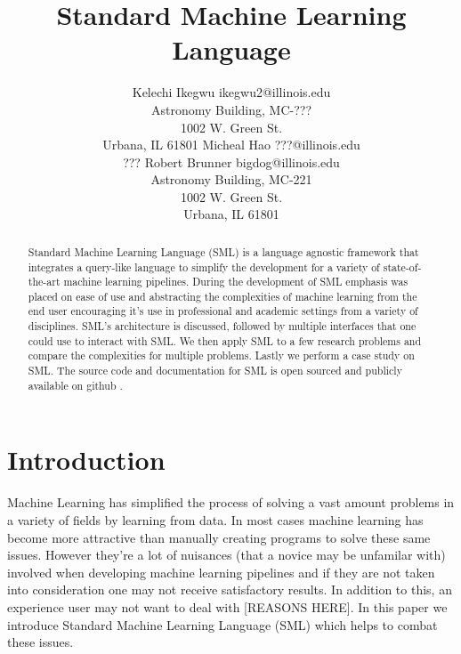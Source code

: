 \documentclass[jair,twoside,11pt,theapa]{article}
\begin{document}
\title{Standard Machine Learning Language}

\author{\name Kelechi Ikegwu \email ikegwu2@illinois.edu \\
        Astronomy Building, MC-??? \\1002 W. Green St.\\ Urbana, IL  61801
       \AND
       \name Micheal Hao  \email ???@illinois.edu \\
       \addr ???
       \AND
       \name Robert Brunner \email bigdog@illinois.edu\\
        Astronomy Building, MC-221 \\1002 W. Green St.\\ Urbana, IL  61801}


\maketitle


\begin{abstract}
Standard Machine Learning Language (SML) is a language agnostic framework that integrates a query-like language to simplify the development for a variety of state-of-the-art machine learning pipelines. During the development of SML emphasis was placed on ease of use and abstracting the complexities of machine learning from the end user encouraging it's use in professional and academic settings from a variety of disciplines. SML's architecture is discussed, followed by multiple interfaces that one could use to interact with SML. We then apply SML to a few research problems and compare the complexities for multiple problems. Lastly we perform a case study on SML. The source code and documentation for SML is open sourced and publicly available on github \cite{ginsberg}.
\end{abstract}

\section{Introduction}
\label{Introduction}

Machine Learning has simplified the process of solving a vast amount problems in a variety of fields by learning from data. In most cases machine learning has become more attractive than manually creating programs to solve these same issues. However they're a lot of nuisances (that a novice may be unfamilar with) involved when developing machine learning pipelines \cite{pedros:fewUsefulThings} and if they are not taken into consideration one may not receive satisfactory results. In addition to this, an experience user may not want to deal with [REASONS HERE]. In this paper we introduce Standard Machine Learning Language (SML)  which helps to combat these issues.
\end{document}
